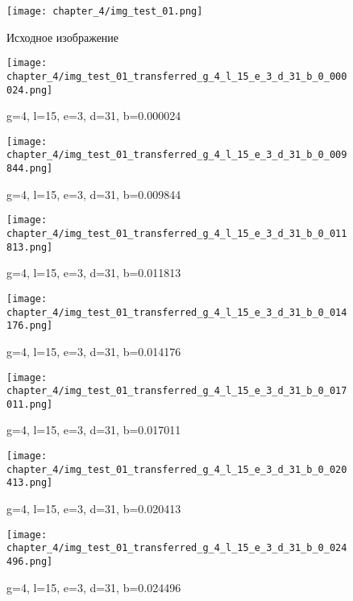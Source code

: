 \begin{figure}[h]
\begin{center}
\begin{minipage}[h]{0.4\linewidth}
\texttt{[image: chapter\_4/img\_test\_01.png]}
\caption{Исходное изображение} %
\label{img:experimoriginal} %
\end{minipage}
\hfill 
\begin{minipage}[h]{0.4\linewidth}
\texttt{[image: chapter\_4/img\_test\_01\_transferred\_g\_4\_l\_15\_e\_3\_d\_31\_b\_0\_000024.png]}
\caption{g=4, l=15, e=3, d=31, b=0.000024}
\label{img:experimcoded2}
\end{minipage}
\end{center}

\begin{center}
\begin{minipage}[h]{0.4\linewidth}
\texttt{[image: chapter\_4/img\_test\_01\_transferred\_g\_4\_l\_15\_e\_3\_d\_31\_b\_0\_009844.png]}
\caption{g=4, l=15, e=3, d=31, b=0.009844}
\label{img:experimcoded3}
\end{minipage}
\hfill 
\begin{minipage}[h]{0.4\linewidth}
\texttt{[image: chapter\_4/img\_test\_01\_transferred\_g\_4\_l\_15\_e\_3\_d\_31\_b\_0\_011813.png]}
\caption{g=4, l=15, e=3, d=31, b=0.011813}
\label{img:experimcoded4}
\end{minipage}
\end{center}
\end{figure}

\begin{figure}[h]
\begin{center}
\begin{minipage}[h]{0.4\linewidth}
\texttt{[image: chapter\_4/img\_test\_01\_transferred\_g\_4\_l\_15\_e\_3\_d\_31\_b\_0\_014176.png]}
\caption{g=4, l=15, e=3, d=31, b=0.014176}
\label{img:experimcoded5}
\end{minipage}
\hfill 
\begin{minipage}[h]{0.4\linewidth}
\texttt{[image: chapter\_4/img\_test\_01\_transferred\_g\_4\_l\_15\_e\_3\_d\_31\_b\_0\_017011.png]}
\caption{g=4, l=15, e=3, d=31, b=0.017011}
\label{img:experimcoded6}
\end{minipage}
\end{center}

\begin{center}
\begin{minipage}[h]{0.4\linewidth}
\texttt{[image: chapter\_4/img\_test\_01\_transferred\_g\_4\_l\_15\_e\_3\_d\_31\_b\_0\_020413.png]}
\caption{g=4, l=15, e=3, d=31, b=0.020413}
\label{img:experimcoded7}
\end{minipage}
\hfill 
\begin{minipage}[h]{0.4\linewidth}
\texttt{[image: chapter\_4/img\_test\_01\_transferred\_g\_4\_l\_15\_e\_3\_d\_31\_b\_0\_024496.png]}
\caption{g=4, l=15, e=3, d=31, b=0.024496}
\label{img:experimcoded8}
\end{minipage}
\end{center}
\end{figure}

